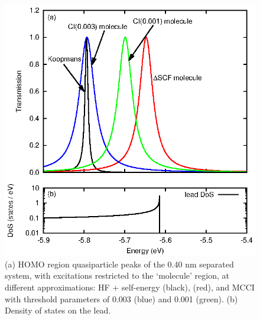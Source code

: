 \begin{figure}
	\begin{center}
		\includegraphics[width=0.9\linewidth]{figures/figure6a_6b}
	\end{center}
	\caption{(a) HOMO region quasiparticle peaks of the 0.40 nm separated
	         system, with excitations restricted to the `molecule' region,
		 at different approximations: HF + self-energy (black),
		 \dscf (red), and MCCI with threshold parameters of
		 0.003 (blue) and 0.001 (green). (b) Density of states on the
		 lead.}
	\label{fig:all40Ahomo}
\end{figure}

